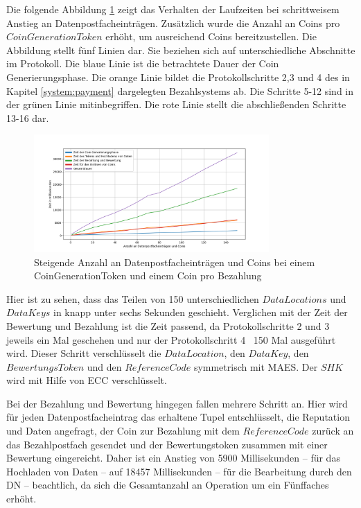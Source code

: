 \documentclass[
	fontsize=11pt,
	headings=small,
	parskip=half,           %
	bibliography=totoc,
	numbers=noenddot,       %
	open=any,               %
]{scrreprt}
\begin{document}
Die folgende Abbildung \ref{fig:win_3} zeigt das Verhalten der Laufzeiten bei schrittweisem Anstieg an Datenpostfacheinträgen. Zusätzlich wurde die Anzahl an Coins pro $CoinGenerationToken$ erhöht, um ausreichend Coins bereitzustellen. Die Abbildung stellt fünf Linien dar. Sie beziehen sich auf unterschiedliche Abschnitte im Protokoll. Die blaue Linie ist die betrachtete Dauer der Coin Generierungsphase. Die orange Linie bildet die Protokollschritte 2,3 und 4 des in Kapitel \ref{system:payment} dargelegten Bezahlsystems ab. Die Schritte 5-12 sind in der grünen Linie mitinbegriffen. Die rote Linie stellt die abschließenden Schritte 13-16 dar.
\begin{figure}[H]
    \caption{Steigende Anzahl an Datenpostfacheinträgen und Coins bei einem CoinGenerationToken und einem Coin pro Bezahlung}
    \label{fig:win_3}
    \centering
    \includegraphics[width=0.8\textwidth]{figure_win_3.png}
\end{figure}
Hier ist zu sehen, dass das Teilen von 150 unterschiedlichen $DataLocations$ und $DataKeys$ in knapp unter sechs Sekunden geschieht. Verglichen mit der Zeit der Bewertung und Bezahlung ist die Zeit passend, da Protokollschritte 2 und 3 jeweils ein Mal geschehen und nur der Protokollschritt 4 \ 150 Mal ausgeführt wird. Dieser Schritt verschlüsselt die $DataLocation$, den $DataKey$, den $BewertungsToken$ und den $ReferenceCode$ symmetrisch mit MAES. Der $SHK$ wird mit Hilfe von ECC verschlüsselt.

Bei der Bezahlung und Bewertung hingegen fallen mehrere Schritt an. Hier wird für jeden Datenpostfacheintrag das erhaltene Tupel entschlüsselt, die Reputation und Daten angefragt, der Coin zur Bezahlung mit dem $ReferenceCode$ zurück an das Bezahlpostfach gesendet und der Bewertungstoken zusammen mit einer Bewertung eingereicht. Daher ist ein Anstieg von 5900 Millisekunden -- für das Hochladen von Daten -- auf 18457 Millisekunden -- für die Bearbeitung durch den DN -- beachtlich, da sich die Gesamtanzahl an Operation um ein Fünffaches erhöht.
\end{document}
